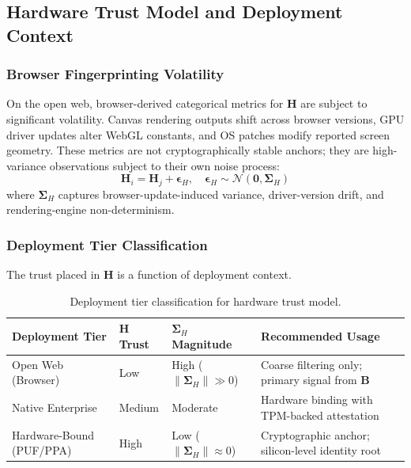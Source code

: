 \documentclass[11pt,twoside]{amsart}
\theoremstyle{plain}
\theoremstyle{definition}
\theoremstyle{remark}
\newcommand{\bH}{\mathbf{H}}
\newcommand{\bB}{\mathbf{B}}
\newcommand{\bepsilon}{\boldsymbol{\epsilon}}
\newcommand{\bSigma}{\boldsymbol{\Sigma}}
\newcommand{\calN}{\mathcal{N}}
\begin{document}
\subsection{Hardware Trust Model and Deployment Context}

\subsubsection{Browser Fingerprinting Volatility}

On the open web, browser-derived categorical metrics for $\bH$ are subject to significant volatility. Canvas rendering outputs shift across browser versions, GPU driver updates alter WebGL constants, and OS patches modify reported screen geometry. These metrics are not cryptographically stable anchors; they are high-variance observations subject to their own noise process:
\begin{equation}
\bH_i = \bH_j + \bepsilon_H, \quad \bepsilon_H \sim \calN(\mathbf{0}, \bSigma_H)
\end{equation}
where $\bSigma_H$ captures browser-update-induced variance, driver-version drift, and rendering-engine non-determinism.

\subsubsection{Deployment Tier Classification}

The trust placed in $\bH$ is a function of deployment context.

\begin{table}[htbp]
\centering
\caption{Deployment tier classification for hardware trust model.}
\label{tab:tiers}
\begin{tabular}{@{}p{2.8cm}p{2cm}p{2.8cm}p{4cm}@{}}
\toprule
\textbf{Deployment Tier} & \textbf{$\bH$ Trust} & \textbf{$\bSigma_H$ Magnitude} & \textbf{Recommended Usage} \\
\midrule
Open Web (Browser) & Low & High ($\|\bSigma_H\| \gg 0$) & Coarse filtering only; primary signal from $\bB$ \\
Native Enterprise & Medium & Moderate & Hardware binding with TPM-backed attestation \\
Hardware-Bound (PUF/PPA) & High & Low ($\|\bSigma_H\| \approx 0$) & Cryptographic anchor; silicon-level identity root \\
\bottomrule
\end{tabular}
\end{table}
\end{document}
